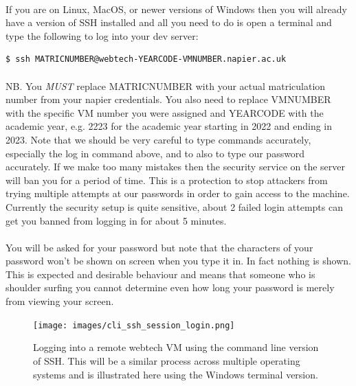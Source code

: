 \documentclass[12pt, a4paper, oneside]{book}
\begin{document}
\paragraph{} If you are on Linux, MacOS, or newer versions of Windows then you will already have a version of SSH installed and all you need to do is open a terminal and type the following to log into your dev server:

\begin{lstlisting}[style=DOS]
    $ ssh MATRICNUMBER@webtech-YEARCODE-VMNUMBER.napier.ac.uk
\end{lstlisting}

\paragraph{} NB. You \emph{MUST} replace MATRICNUMBER with your actual matriculation number from your napier credentials. You also need to replace VMNUMBER with the specific VM number you were assigned and YEARCODE with the academic year, e.g. 2223 for the academic year starting in 2022 and ending in 2023. Note that we should be very careful to type commands accurately, especially the log in command above, and to also to type our password accurately. If we make too many mistakes then the security service on the server will ban you for a period of time. This is a protection to stop attackers from trying multiple attempts at our passwords in order to gain access to the machine. Currently the security setup is quite sensitive, about 2 failed login attempts can get you banned from logging in for about 5 minutes.

\paragraph{} You will be asked for your password but note that the characters of your password won't be shown on screen when you type it in. In fact nothing is shown. This is expected and desirable behaviour and means that someone who is shoulder surfing you cannot determine even how long your password is merely from viewing your screen.

\begin{figure}[H]
\centering
\texttt{[image: images/cli\_ssh\_session\_login.png]}
\caption{Logging into a remote webtech VM using the command line version of SSH. This will be a similar process across multiple operating systems and is illustrated here using the Windows terminal version.}
\label{fig:cli-ssh-session-login}
\end{figure}
\end{document}
